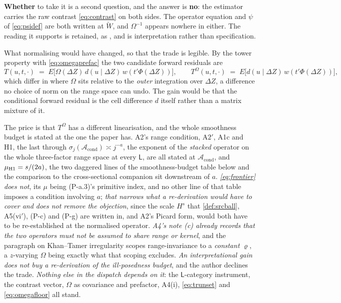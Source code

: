 \medskip
\noindent
 \textbf{Whether} to take it is a second question, and the answer is \textbf{no}: the estimator
carries the raw contrast \eqref{eq:contrast} on both sides. The operator equation and $\psi$ of
\eqref{eq:psidef} are both written at $\widetilde W$, and $\Omega^{-1}$ appears nowhere in either.
The reading it supports is retained, as , and is interpretation rather than
specification.

What normalising would have changed, so that the trade is legible. By the tower property with
\eqref{eq:omegaprefac} the two candidate forward residuals are
\[
T(u,t,\cdot)\;=\;E\big[\Omega(\Delta Z)\,d(u\mid\Delta Z)\,w(t'\Phi(\Delta Z))\big],
\qquad
T^{\Omega}(u,t,\cdot)\;=\;E\big[d(u\mid\Delta Z)\,w(t'\Phi(\Delta Z))\big] ,
\]
which differ in where $\Omega$ sits relative to the \emph{outer} integration over $\Delta Z$, a
difference no choice of norm on the range space can undo. The gain would be that the conditional
forward residual is the cell difference $d$ itself rather than a matrix mixture of it.

The price is that $T^{\Omega}$ has a different linearisation, and the whole smoothness budget is
stated at the one the paper has. A2's range condition, A$2'$, A1c and H1, the last through
$\sigma_j(\mathcal A_{\mathrm{cond}})\asymp j^{-a}$, the exponent of the \emph{stacked} operator on the
whole three-factor range space at every $\mathsf L$, are all stated at $\mathcal A_{\mathrm{cond}}$,
and $\mu_{\text{\textup{H1}}}=s/(2a)$, the two daggered lines of the smoothness-budget table below and
the comparison to the cross-sectional companion sit downstream of $a$. \emph{\eqref{eq:frontier} does
not}, its $\mu$ being (P-a.3)'s primitive index, and no other line of that table imposes a condition
involving $a$; \emph{that
narrows what a re-derivation would have to cover and does not remove the objection}, since the scale
$H^{s}$ that \cref{def:srcball}, A5(vi$'$), (P-c) and (P-g) are written in, and A2's Picard form, would
both have to be re-established at the normalised operator. \emph{A4's note (c) already records that the two
operators must not be assumed to share range or kernel}, and the paragraph on Khan--Tamer irregularity
scopes range-invariance to a \emph{constant} $\varrho$, a $z$-varying $\Omega$ being exactly what that
scoping excludes. \emph{An interpretational gain does not buy a re-derivation of the
ill-posedness budget}, and the author declines the trade. \emph{Nothing else in the dispatch depends on
it}: the $\mathsf L$-category instrument, the contrast vector, $\Omega$ as covariance and prefactor,
A4(i), \eqref{eq:trunset} and \eqref{eq:omegafloor} all stand.

